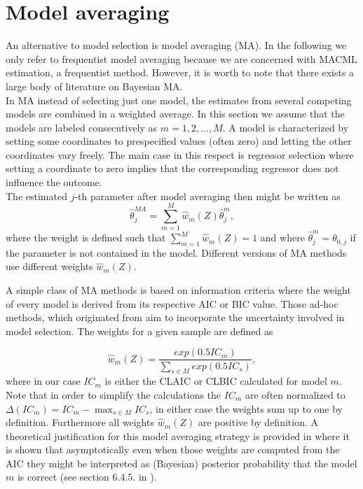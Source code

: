 \documentclass[12pt, a4paper]{article}
\numberwithin{defcounter}{section}
\numberwithin{excounter}{section}
\begin{document}
\section{Model averaging}
\label{chap:MA}

An alternative to model selection is model averaging (\ac{MA}). In the following we only refer to frequentist model averaging because we are concerned with \ac{MACML} estimation, a frequentist method. However, it is worth to note that there exists a large body of literature on Bayesian \ac{MA}.
\\
In \ac{MA} instead of selecting just one model, the estimates from several competing models are combined in a weighted average. 
In this section we assume that the models are labeled consecutively as 
$m = 1,2,...,M$. A model is characterized by setting some coordinates to 
prespecified values (often zero) and letting the other coordinates vary 
freely. The main case in this respect is regressor selection where setting
a coordinate to zero implies that the corresponding regressor does not 
influence the outcome. 
\\
The estimated $j$-th parameter after model averaging then might be written as
\begin{equation}
\hat{\theta}_j^{MA} = \sum_{m =1}^{M} \hat{w}_m (Z) \hat{\theta}_j^m,
\end{equation}
where the weight is defined 
such that $\sum_{m =1}^M \hat{w}_m (Z)= 1$ and where
$\hat \theta_j^m = \theta_{0,j}$ if the parameter is not contained in the model. 
Different versions of \ac{MA} methods use different weights $\hat{w}_m (Z)$. 

A simple class of \ac{MA} methods is based on information criteria where the weight of every model is derived from its respective \ac{AIC} or \ac{BIC} value. Those ad-hoc methods, which originated from \cite{buckland1997} aim to incorporate the uncertainty involved in model selection. The weights for a given sample are defined as

\begin{equation}
\label{eq:AICw}
\hat{w}_m (Z) = \frac{exp(0.5 IC_{m})}{\sum_{s \in M} exp(0.5 IC_{s})},
\end{equation}
where in our case $IC_{m}$ is either the \ac{CLAIC} or \ac{CLBIC} calculated for model $m$. Note that in order to simplify the calculations the $IC_{m}$ are often normalized to $\Delta(IC_{m}) = IC_{m} - \max_{s \in M} IC_{s}$, in either case the weights sum up to one by definition. Furthermore all weights  $\hat{w}_m (Z)$ are positive by definition. A theoretical justification for this model averaging strategy is provided in \cite{burnham2002} where it is shown that asymptotically even when those weights are computed from the \ac{AIC} they might be interpreted as (Bayesian) posterior probability that the model $m$ is correct (see section 6.4.5. in \citep{burnham2002}).
\end{document}

